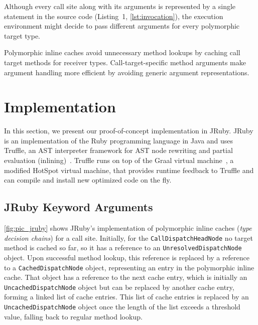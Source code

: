 \documentclass[10pt]{sigplanconf}
\begin{document}
Although every call site along with its arguments is represented by a single statement in the source code (\eg Listing~1, \autoref{lst:invocation}), the execution environment might decide to pass different arguments for every polymorphic target type.

Polymorphic inline caches avoid unnecessary method lookups by caching call target methods for receiver types. Call-target-specific method arguments make argument handling more efficient by avoiding generic argument representations.

\section{Implementation}
In this section, we present our proof-of-concept implementation in JRuby. JRuby is an implementation of the Ruby programming language in Java and uses Truffle, an AST interpreter framework for AST node rewriting and partial evaluation (inlining)~\cite{Wurthinger:2013:OVR:2509578.2509581, Wurthinger:2012:SAI:2384577.2384587}. Truffle runs on top of the Graal virtual machine~\cite{Wimmer:2012:TSR:2384716.2384723}, a modified HotSpot virtual machine, that provides runtime feedback to Truffle and can compile and install new optimized code on the fly.

\subsection{JRuby Keyword Arguments}
\autoref{fig:pic_jruby} shows JRuby's implementation of polymorphic inline
caches (\emph{type decision chains}) for a call site. Initially, for the
\lstinline{CallDispatchHeadNode} no target method is cached so far, so it has a reference to an \lstinline{UnresolvedDispatchNode} object. Upon successful method lookup, this reference is replaced by a reference to a \lstinline{CachedDispatchNode} object, representing an entry in the polymorphic inline cache. That object has a reference to the next cache entry, which is initially an \lstinline{UncachedDispatchNode} object but can be replaced by another cache entry, forming a linked list of cache entries. This list of cache entries is replaced by an \lstinline{UncachedDispatchNode} object once the length of the list exceeds a threshold value, falling back to regular method lookup.
\end{document}
